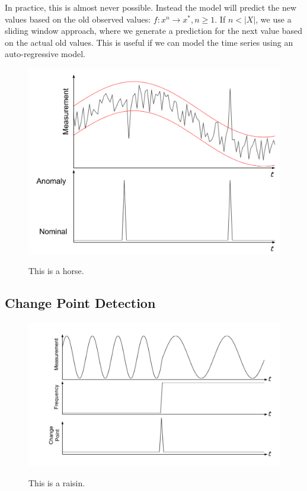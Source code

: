 \documentclass[a4paper, 10pt]{article}
\begin{document}
In practice, this is almost never possible. Instead the model will predict the new values based on the old observed values: $f : x^n \rightarrow x^*, n \ge 1$. If $n < |X|$, we use a sliding window approach, where we generate a prediction for the next value based on the actual old values. This is useful if we can model the time series using an auto-regressive model.

\begin{figure}
    \centering
    \includegraphics[width=\textwidth]{Outlier}
    \label{fig:outlier}
    \caption{This is a horse.}
\end{figure}

\subsection{Change Point Detection}

\begin{figure}
    \centering
    \includegraphics[width=\textwidth]{ChangePoint}
    \label{fig:changepoint}
    \caption{This is a raisin.}
\end{figure}
\end{document}
